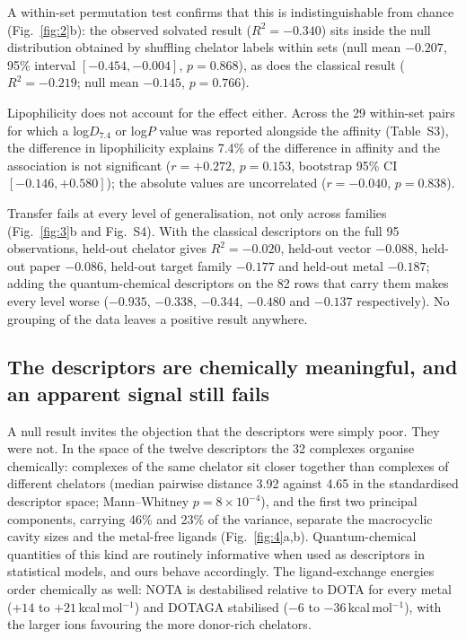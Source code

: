 \documentclass[twoside,twocolumn,9pt]{article}
\begin{document}
A within-set permutation test confirms that this is indistinguishable from chance (Fig.~\ref{fig:2}b): the observed solvated result ($R^2 = -0.340$) sits inside the null distribution obtained by shuffling chelator labels within sets (null mean $-0.207$, 95\% interval $[-0.454, -0.004]$, $p = 0.868$), as does the classical result ($R^2 = -0.219$; null mean $-0.145$, $p = 0.766$).

Lipophilicity does not account for the effect either. Across the 29 within-set pairs for which a log$D_{7.4}$ or log$P$ value was reported alongside the affinity (Table~S3), the difference in lipophilicity explains 7.4\% of the difference in affinity and the association is not significant ($r = +0.272$, $p = 0.153$, bootstrap 95\% CI $[-0.146, +0.580]$); the absolute values are uncorrelated ($r = -0.040$, $p = 0.838$).

Transfer fails at every level of generalisation, not only across families (Fig.~\ref{fig:3}b and Fig.~S4). With the classical descriptors on the full 95 observations, held-out chelator gives $R^2 = -0.020$, held-out vector $-0.088$, held-out paper $-0.086$, held-out target family $-0.177$ and held-out metal $-0.187$; adding the quantum-chemical descriptors on the 82 rows that carry them makes every level worse ($-0.935$, $-0.338$, $-0.344$, $-0.480$ and $-0.137$ respectively). No grouping of the data leaves a positive result anywhere.

\subsection{The descriptors are chemically meaningful, and an apparent signal still fails}

A null result invites the objection that the descriptors were simply poor. They were not. In the space of the twelve descriptors the 32 complexes organise chemically: complexes of the same chelator sit closer together than complexes of different chelators (median pairwise distance 3.92 against 4.65 in the standardised descriptor space; Mann--Whitney $p = 8 \times 10^{-4}$), and the first two principal components, carrying 46\% and 23\% of the variance, separate the macrocyclic cavity sizes and the metal-free ligands (Fig.~\ref{fig:4}a,b). Quantum-chemical quantities of this kind are routinely informative when used as descriptors in statistical models,\cite{Kang2025QSAR} and ours behave accordingly. The ligand-exchange energies order chemically as well: NOTA is destabilised relative to DOTA for every metal ($+14$ to $+21$\,kcal\,mol$^{-1}$) and DOTAGA stabilised ($-6$ to $-36$\,kcal\,mol$^{-1}$), with the larger ions favouring the more donor-rich chelators.
\end{document}
